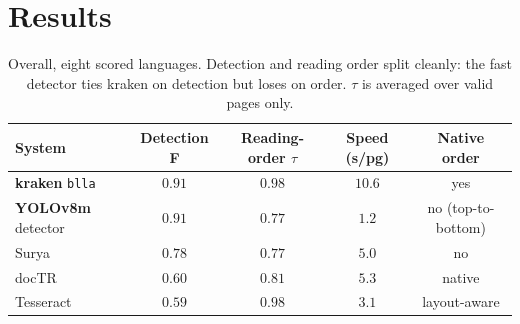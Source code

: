 \documentclass[11pt]{article}
\newcommand{\tw}{\ensuremath{\tau}}
\begin{document}
\section{Results}

\begin{table}[t]
\centering
\caption{Overall, eight scored languages. Detection and reading order split
cleanly: the fast detector ties kraken on detection but loses on order. \tw{} is
averaged over valid pages only.}
\label{tab:overall}
\begin{tabular}{lcccc}
\toprule
System & Detection F & Reading-order \tw{} & Speed (s/pg) & Native order \\
\midrule
\textbf{kraken} \texttt{blla} & $0.91$ & $\mathbf{0.98}$ & $10.6$ & yes \\
\textbf{YOLOv8m} detector     & $0.91$ & $0.77$          & $\mathbf{1.2}$ & no (top-to-bottom) \\
Surya                         & $0.78$ & $0.77$          & $5.0$ & no \\
docTR                         & $0.60$ & $0.81$          & $5.3$ & native \\
Tesseract                     & $0.59$ & $0.98$          & $3.1$ & layout-aware \\
\bottomrule
\end{tabular}
\end{table}
\end{document}
